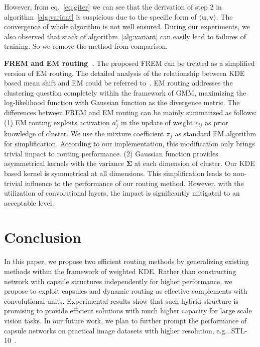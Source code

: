 \documentclass[runningheads]{llncs}
\begin{document}
However, from eq.~\ref{eq:giter} we can see that the derivation of step 2 in algorithm~\ref{alg:variant} is suspicious due to the specific form of $\langle{\boldsymbol{u},\boldsymbol{v}}\rangle$. The convergence of whole algorithm is not well ensured. During our experiments, we also observed that stack of algorithm~\ref{alg:variant} can easily lead to failures of training. So we remove the method from comparison.







\textbf{FREM and EM routing~\cite{hinton2018emrouting}.} The proposed FREM can be treated as a simplified version of EM routing. The detailed analysis of the relationship between KDE based mean shift and EM could be referred to~\cite{4135673}. EM routing addresses the clustering question completely within the framework of GMM, maximizing the log-likelihood function with Gaussian function as the divergence metric. The differences between FREM and EM routing can be mainly summarized as follows: (1) EM routing exploits activation $a_j^v$ in the update of weight $r_{ij}$ as prior knowledge of cluster. We use the mixture coefficient $\pi_{j}$ as standard EM algorithm for simplification. According to our implementation, this modification only brings trivial impact to routing performance. (2) Gaussian function provides asymmetrical kernels with the variance $\boldsymbol{\Sigma}$ at each dimension of cluster. Our KDE based kernel is symmetrical at all dimensions. This simplification leads to non-trivial influence to the performance of our routing method. However, with the utilization of convolutional layers, the impact is significantly mitigated to an acceptable level. 






\section{Conclusion}
In this paper, we propose two efficient routing methods by generalizing existing methods within the framework of weighted KDE. Rather than constructing network with capsule structures independently for higher performance, we propose to exploit capsules and dynamic routing as effective complements with convolutional units. Experimental results show that such hybrid structure is promising to provide efficient solutions with much higher capacity for large scale vision tasks. In our future work, we plan to further prompt the performance of capsule networks on practical image datasets with higher resolution, e.g., STL-10~\cite{coates2011analysis}.


\end{document}
